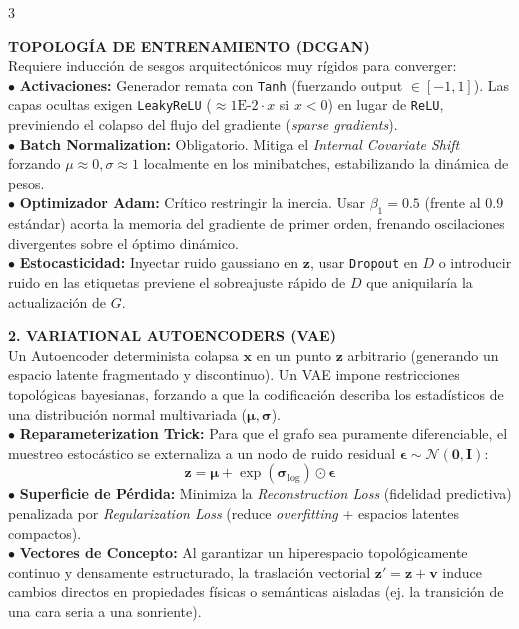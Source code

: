 \documentclass[8pt,a4paper,landscape,fleqn]{extarticle}
\begin{document}
\begin{multicols*}{3}
\begin{center}
\end{center}
\vspace{-2mm}
\textbf{TOPOLOGÍA DE ENTRENAMIENTO (DCGAN)}\\
Requiere inducción de sesgos arquitectónicos muy rígidos para converger:\\
$\bullet$ \textbf{Activaciones:} Generador remata con \texttt{Tanh} (fuerzando output $\in [-1,1]$). Las capas ocultas exigen \texttt{LeakyReLU} ($\approx 1\text{E-}2 \cdot x$ si $x<0$) en lugar de \texttt{ReLU}, previniendo el colapso del flujo del gradiente (\textit{sparse gradients}).\\
$\bullet$ \textbf{Batch Normalization:} Obligatorio. Mitiga el \textit{Internal Covariate Shift} forzando $\mu \approx 0, \sigma \approx 1$ localmente en los minibatches, estabilizando la dinámica de pesos.\\
$\bullet$ \textbf{Optimizador Adam:} Crítico restringir la inercia. Usar $\beta_1 = 0.5$ (frente al $0.9$ estándar) acorta la memoria del gradiente de primer orden, frenando oscilaciones divergentes sobre el óptimo dinámico.\\
$\bullet$ \textbf{Estocasticidad:} Inyectar ruido gaussiano en $\bm{z}$, usar \texttt{Dropout} en $D$ o introducir ruido en las etiquetas previene el sobreajuste rápido de $D$ que aniquilaría la actualización de $G$.

\textbf{2. VARIATIONAL AUTOENCODERS (VAE)}\\
Un Autoencoder determinista colapsa $\bm{x}$ en un punto $\bm{z}$ arbitrario (generando un espacio latente fragmentado y discontinuo). Un VAE impone restricciones topológicas bayesianas, forzando a que la codificación describa los estadísticos de una distribución normal multivariada ($\bm{\mu}, \bm{\sigma}$).\\
$\bullet$ \textbf{Reparameterization Trick:} Para que el grafo sea puramente diferenciable, el muestreo estocástico se externaliza a un nodo de ruido residual $\bm{\epsilon} \sim \mathcal{N}(\bm{0},\bm{I})$:
$$\bm{z} = \bm{\mu} + \exp(\bm{\sigma}_{\log}) \odot \bm{\epsilon}$$
$\bullet$ \textbf{Superficie de Pérdida:} Minimiza la \textit{Reconstruction Loss} (fidelidad predictiva) penalizada por \textit{Regularization Loss} (reduce \textit{overfitting} + espacios latentes compactos).\\
$\bullet$ \textbf{Vectores de Concepto:} Al garantizar un hiperespacio topológicamente continuo y densamente estructurado, la traslación vectorial $\bm{z}' = \bm{z} + \bm{v}$ induce cambios directos en propiedades físicas o semánticas aisladas (ej. la transición de una cara seria a una sonriente).


\end{multicols*}
\end{document}
